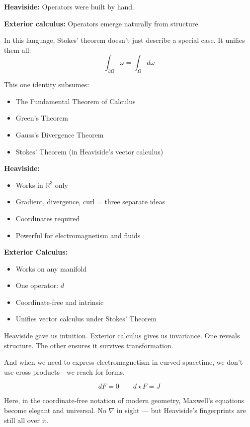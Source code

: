 \bigskip

\textbf{Heaviside:}  
Operators were built by hand.

\textbf{Exterior calculus:}  
Operators emerge naturally from structure.

In this language, Stokes’ theorem doesn’t just describe a special case. It unifies them all:
\[
\int_{\partial \Omega} \omega = \int_\Omega d\omega
\]

This one identity subsumes:
\begin{itemize}
    \item The Fundamental Theorem of Calculus
    \item Green’s Theorem
    \item Gauss’s Divergence Theorem
    \item Stokes’ Theorem (in Heaviside’s vector calculus)
\end{itemize}

\bigskip

\begin{tcolorbox}[colback=gray!5!white, colframe=black, title=\textbf{Sidebar: Vector Calculus vs. Differential Forms}, fonttitle=\bfseries, arc=1.5mm, boxrule=0.4pt]

\textbf{Heaviside:}
\begin{itemize}
  \item Works in \( \mathbb{R}^3 \) only
  \item Gradient, divergence, curl = three separate ideas
  \item Coordinates required
  \item Powerful for electromagnetism and fluids
\end{itemize}

\textbf{Exterior Calculus:}
\begin{itemize}
  \item Works on any manifold
  \item One operator: \( d \)
  \item Coordinate-free and intrinsic
  \item Unifies vector calculus under Stokes’ Theorem
\end{itemize}

\end{tcolorbox}

\bigskip

Heaviside gave us intuition. Exterior calculus gives us invariance.  
One reveals structure. The other ensures it survives transformation.

And when we need to express electromagnetism in curved spacetime,  
we don't use cross products—we reach for forms.

\[
dF = 0 \qquad d \star F = J
\]

Here, in the coordinate-free notation of modern geometry, Maxwell’s equations become elegant and universal.  
No \( \nabla \) in sight — but Heaviside's fingerprints are still all over it.

